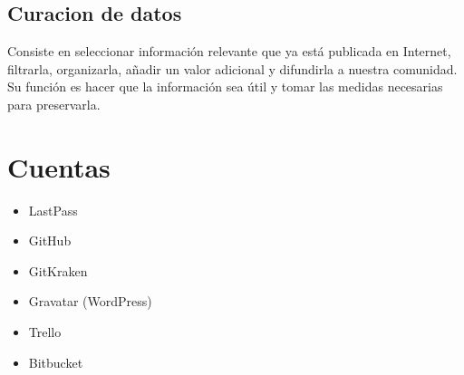 \documentclass[12pt,letterpaper]{article}
\begin{document}
\subsection*{Curacion de datos}
Consiste en seleccionar informaci\'on relevante que ya est\'a publicada en Internet, filtrarla, organizarla, añadir un valor adicional y difundirla a nuestra comunidad.
\citep{DuroCur}
Su funci\'on es hacer que la informaci\'on sea \'util y tomar las medidas necesarias para preservarla.
\citep{ItCur}

\section{Cuentas}
\begin{itemize}
\item LastPass
\item GitHub
\item GitKraken
\item Gravatar (WordPress)
\item Trello
\item Bitbucket
\end{itemize}

 

\end{document}

